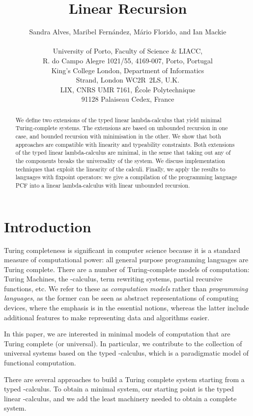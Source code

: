 \documentclass{article}
\title{Linear Recursion}
\author{Sandra Alves, Maribel Fern\'andez, 
M\'{a}rio Florido, and Ian Mackie  \\\\
 University of Porto, Faculty of Science \& LIACC,\\ 
R. do Campo Alegre 1021/55, 4169-007, Porto, Portugal\\
 King's College London, Department of Informatics\\  
Strand, London WC2R~2LS, U.K. \\
 LIX, CNRS UMR 7161, \'Ecole Polytechnique\\ 
91128 Palaiseau Cedex, France
}
\date{}
\begin{document}
\maketitle


\begin{abstract}
We define two extensions of the typed linear lambda-calculus that
yield minimal Turing-complete systems. The extensions are based on
unbounded recursion in one case, and bounded recursion with
minimisation in the other. We show that both approaches are compatible
with linearity and typeability constraints. Both extensions of the
typed linear lambda-calculus are minimal, in the sense that taking out
any of the components breaks the universality of the system.  We
discuss implementation techniques that exploit the linearity of the
calculi.  Finally, we apply the results to languages with fixpoint
operators: we give a compilation of the programming language PCF into
a linear lambda-calculus with linear unbounded recursion.
\end{abstract}

\section{Introduction}
Turing completeness is significant in computer science because it is a
standard measure of computational power: all general purpose
programming languages are Turing complete.  There are a number of
Turing-complete models of computation: Turing Machines, the
-calculus, term rewriting systems, partial recursive
functions, etc.  We refer to these as \emph{computation models} rather
than \emph{programming languages}, as the former can be seen as
abstract representations of computing devices, where the emphasis is
in the essential notions, whereas the latter include additional
features to make representing data and algorithms easier.

In this paper, we are interested in minimal models of computation that
are Turing complete (or universal).  In particular, we contribute to
the collection of universal systems based on the typed
-calculus, which is a paradigmatic  model of functional
computation.

There are several approaches to build a Turing complete system
starting from a typed -calculus. To obtain a minimal system,
our starting point is the typed linear -calculus, and we
add the least machinery needed to obtain a complete
system.
\end{document}
